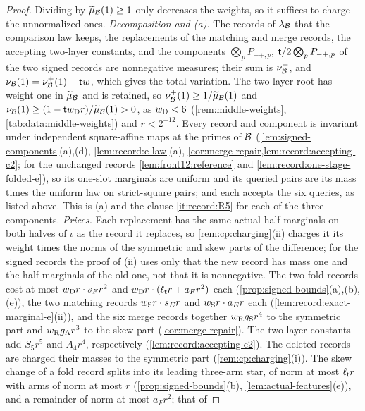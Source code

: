 \begin{proof}
Dividing by $\widetilde\mu_\mathcal B(1)\ge1$ only decreases the weights, so it suffices to
charge the unnormalized ones. \emph{Decomposition and (a).} The records of
$\lambda_\mathcal B$ that the comparison law keeps, the replacements of the matching
and merge records, the accepting two-layer constants, and the components $\bigotimes_pP_{++,p}$, $\mathsf t/2\bigotimes_pP_{-+,p}$
of the two signed records are nonnegative measures; their sum is $\nu^+_\mathcal B$,
and $\nu_\mathcal B(1)=\nu^+_\mathcal B(1)-\mathsf t w$, which gives the total variation. The
two-layer root has weight one in $\widetilde\mu_\mathcal B$ and is retained, so
$\nu^+_\mathcal B(1)\ge1/\widetilde\mu_\mathcal B(1)$ and
$\nu_\mathcal B(1)\ge(1-\mathsf t w_{\rm D}r)/\widetilde\mu_\mathcal B(1)>0$, as $w_{\rm D}<6$
(\cref{rem:middle-weights}, \cref{tab:data:middle-weights}) and $r<2^{-12}$. Every
record and component is invariant under independent square-affine maps at the
primes of $\mathcal B$ (\cref{lem:signed-components}(a),(d), \cref{lem:record:e-law}(a),
\cref{cor:merge-repair,lem:record:accepting-c2}; for the unchanged records \cref{lem:front12:reference}
and \cref{lem:record:one-stage-folded-e}), so its one-slot marginals are uniform
and its queried pairs are its mass times the uniform law on strict-square pairs; and each accepts
the six queries, as listed above. This is (a) and the clause \ref{it:record:R5}
for each of the three components. \emph{Prices.} Each replacement has the same
actual half marginals on both halves of $\iota$ as the record it replaces, so
\cref{rem:cp:charging}(ii) charges it its weight times the norms of the symmetric
and skew parts of the difference; for the signed records the proof of (ii) uses
only that the new record has mass one and the half marginals of the old one,
not that it is nonnegative. The two fold records cost at most
$w_{\rm D}r\cdot s_Fr^2$ and $w_{\rm D}r\cdot(\ell_\mathsf t r+a_Fr^2)$ each
(\cref{prop:signed-bounds}(a),(b),(e)), the two matching records
$w_{\rm S}r\cdot s_Er$ and $w_{\rm S}r\cdot a_Er$ each
(\cref{lem:record:exact-marginal-e}(ii)), and the six merge records together
$w_{\rm R}g_{\rm S}r^4$ to the symmetric part and $w_{\rm R}g_{\rm A}r^3$ to the skew
part (\cref{cor:merge-repair}). The two-layer constants add $S_5r^5$ and
$A_4r^4$, respectively (\cref{lem:record:accepting-c2}). The deleted records are
charged their masses to the symmetric part (\cref{rem:cp:charging}(i)). The skew
change of a fold record splits into its leading three-arm star, of norm at most
$\ell_\mathsf t r$ with arms of norm at most $r$ (\cref{prop:signed-bounds}(b),
\cref{lem:actual-features}(e)), and a remainder of norm at most $a_Fr^2$; that of

\end{proof}
